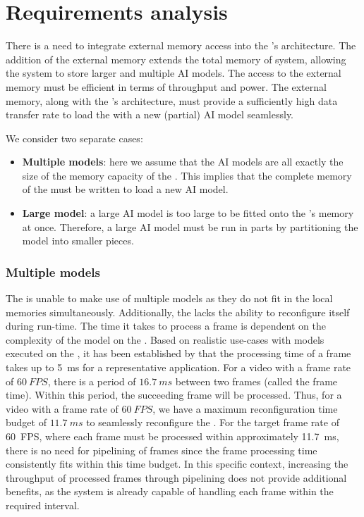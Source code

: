 \section{Requirements analysis}
There is a need to integrate external memory access into the \graicore{}'s architecture.
The addition of the external memory extends the total memory of system, allowing the system to store larger and multiple AI models.
The access to the external memory must be efficient in terms of throughput and power.
The external memory, along with the \graicore{}’s architecture, must provide a sufficiently high data transfer rate to load the \graicore{} with a new (partial) AI model seamlessly.

We consider two separate cases:
\begin{itemize}
    \item \textbf{Multiple models}: here we assume that the AI models are all exactly the size of the memory capacity of the \graicore{}.
    This implies that the complete memory of the \graicore{} must be written to load a new AI model.
    \item \textbf{Large model}: a large AI model is too large to be fitted onto the \graicore{}'s memory at once.
    Therefore, a large AI model must be run in parts by partitioning the model into smaller pieces.
\end{itemize}

\subsubsection{Multiple models}
The \graicore{} is unable to make use of multiple models as they do not fit in the local memories simultaneously.
Additionally, the \graicore{} lacks the ability to reconfigure itself during run-time.
The time it takes to process a frame is dependent on the complexity of the model on the \graicore{}.
Based on realistic use-cases with models executed on the \graicore{}, it has been established by \snap{} that the processing time of a frame takes up to \SI{5}{ms} for a representative application.
For a video with a frame rate of $\SI{60}{FPS}$, there is a period of $\SI{16.7}{ms}$ between two frames (called the frame time).
Within this period, the succeeding frame will be processed.
Thus, for a video with a frame rate of $\SI{60}{FPS}$, we have a maximum reconfiguration time budget of $\SI{11.7}{ms}$ to seamlessly reconfigure the \graicore{}.
For the target frame rate of \SI{60}{FPS}, where each frame must be processed within approximately \SI{11.7}{ms}, there is no need for pipelining of frames since the frame processing time consistently fits within this time budget.
In this specific context, increasing the throughput of processed frames through pipelining does not provide additional benefits, as the system is already capable of handling each frame within the required interval.

